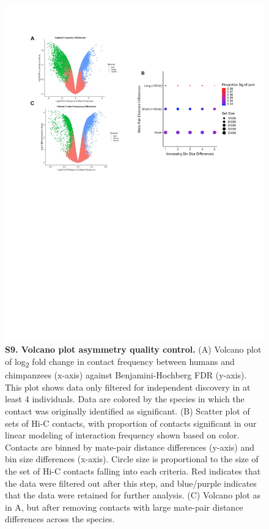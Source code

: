 \begin{figure}[!htb]
\centering
\includegraphics[width=6in]{img/figS9.pdf}
\caption[Volcano plot asymmetry quality control.]{\textbf{S9. Volcano plot asymmetry quality control.} (A) Volcano plot of log\textsubscript{2} fold change in contact frequency between humans and chimpanzees (x-axis) against Benjamini-Hochberg FDR (y-axis). This plot shows data only filtered for independent discovery in at least 4 individuals. Data are colored by the species in which the contact was originally identified as significant. (B) Scatter plot of sets of Hi-C contacts, with proportion of contacts significant in our linear modeling of interaction frequency shown based on color. Contacts are binned by mate-pair distance differences (y-axis) and bin size differences (x-axis). Circle size is proportional to the size of the set of Hi-C contacts falling into each criteria. Red indicates that the data were filtered out after this step, and blue/purple indicates that the data were retained for further analysis. (C) Volcano plot as in A, but after removing contacts with large mate-pair distance differences across the species.}
\label{fig:figS9}
\end{figure}

